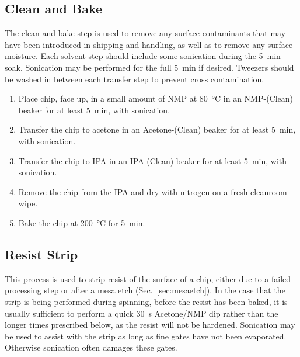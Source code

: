 \subsection{Clean and Bake}
\label{sec:clean}
The clean and bake step is used to remove any surface contaminants that may have been introduced in shipping and handling, as well as to
remove any surface moisture. Each solvent step should include some sonication during the \SI{5}{\minute} soak. Sonication may be performed for
the full \SI{5}{\minute} if desired. Tweezers should be washed in between each transfer step to prevent cross contamination.


\begin{enumerate}
    \item Place chip, face up, in a small amount of NMP at \SI{80}{\celsius} in an NMP-(Clean) beaker for at least \SI{5}{\minute}, with sonication.
    \item Transfer the chip to acetone in an Acetone-(Clean) beaker for at least \SI{5}{\minute}, with sonication.
    \item Transfer the chip to IPA in an IPA-(Clean) beaker for at least \SI{5}{\minute}, with sonication.
    \item Remove the chip from the IPA and dry with nitrogen on a fresh cleanroom wipe.
    \item Bake the chip at \SI{200}{\celsius} for \SI{5}{\minute}.
\end{enumerate}

\subsection{Resist Strip}
\label{sec:strip}
This process is used to strip resist of the surface of a chip, either due to a failed processing step or after a mesa etch (Sec.~\ref{sec:mesaetch}).
In the case that the strip is being performed during spinning, before the resist has been baked, it is usually sufficient to perform a quick \SI{30}{\second}
Acetone/NMP dip rather than the longer times prescribed below, as the resist will not be hardened. Sonication may be used to assist with the strip
as long as fine gates have not been evaporated. Otherwise sonication often damages these gates.


